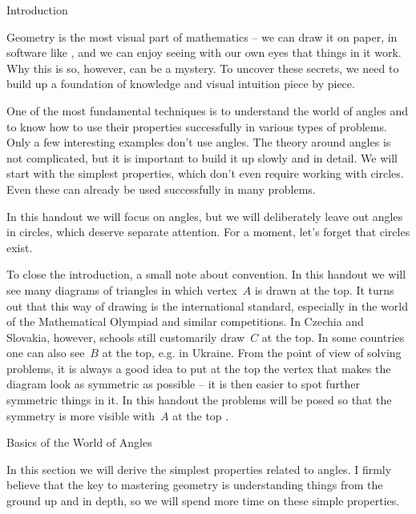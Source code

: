 





\sec Introduction

Geometry is the most visual part of mathematics -- we can draw it on paper, in software like , and we can enjoy seeing with our own eyes that things in it work. Why this is so, however, can be a mystery. To uncover these secrets, we need to build up a foundation of knowledge and visual intuition piece by piece.

One of the most fundamental techniques is to understand the world of angles and to know how to use their properties successfully in various types of problems. Only a few interesting examples don't use angles. The theory around angles is not complicated, but it is important to build it up slowly and in detail. We will start with the simplest properties, which don't even require working with circles. Even these can already be used successfully in many problems.

In this handout we will focus on angles, but we will deliberately leave out angles in circles, which deserve separate attention. For a moment, let's forget that circles exist.

To close the introduction, a small note about convention. In this handout we will see many diagrams of triangles in which vertex~$A$ is drawn at the top. It turns out that this way of drawing is the international standard, especially in the world of the Mathematical Olympiad and similar competitions. In Czechia and Slovakia, however, schools still customarily draw~$C$ at the top. In some countries one can also see~$B$ at the top, e.g. in Ukraine. From the point of view of solving problems, it is always a good idea to put at the top the vertex that makes the diagram look as symmetric as possible -- it is then easier to spot further symmetric things in it. In this handout the problems will be posed so that the symmetry is more visible with~$A$ at the top \SlightSmile.

\sec Basics of the World of Angles

In this section we will derive the simplest properties related to angles. I firmly believe that the key to mastering geometry is understanding things from the ground up and in depth, so we will spend more time on these simple properties.

